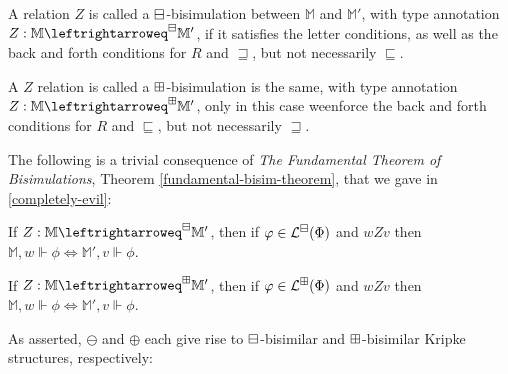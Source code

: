 \begin{mydef}
A relation $Z$ is called a $\boxminus$-bisimulation between $\mathbb{M}$ and
$\mathbb{M}'$, with type annotation $Z:\mathbb{M}\leftrightarroweq^\BM\mathbb{M}'$, if it satisfies the letter
conditions, as well as the back and forth conditions for $R$ and
$\sqsupseteq$, but not necessarily $\sqsubseteq$.

A $Z$ relation is called a $\boxplus$-bisimulation is the same, with type
annotation $Z:\mathbb{M}\leftrightarroweq^\BP\mathbb{M}'$, only in
this case weenforce the back and forth conditions for $R$ and
$\sqsubseteq$, but not necessarily $\sqsupseteq$.
\end{mydef}

The following is a trivial consequence of \emph{The Fundamental
  Theorem of Bisimulations}, Theorem \ref{fundamental-bisim-theorem},
that we gave in \ref{completely-evil}:

\begin{proposition}\label{bmbpbisimprop}
If $Z:\mathbb{M}\leftrightarroweq^\BM\mathbb{M}'$, then if $\varphi \in
\mathcal{L}^\boxminus(\Phi)$ and $w Z v$ then $\mathbb{M},w \Vdash \phi \iff
\mathbb{M}',v \Vdash \phi$.

If $Z:\mathbb{M}\leftrightarroweq^\BP\mathbb{M}'$, then if $\varphi \in
\mathcal{L}^\boxplus(\Phi)$ and $w Z v$ then $\mathbb{M},w \Vdash \phi \iff \mathbb{M}',v \Vdash \phi$.
\end{proposition}

As asserted, $\ominus$ and $\oplus$ each give rise to
$\boxminus$-bisimilar and $\boxplus$-bisimilar Kripke structures, respectively:

